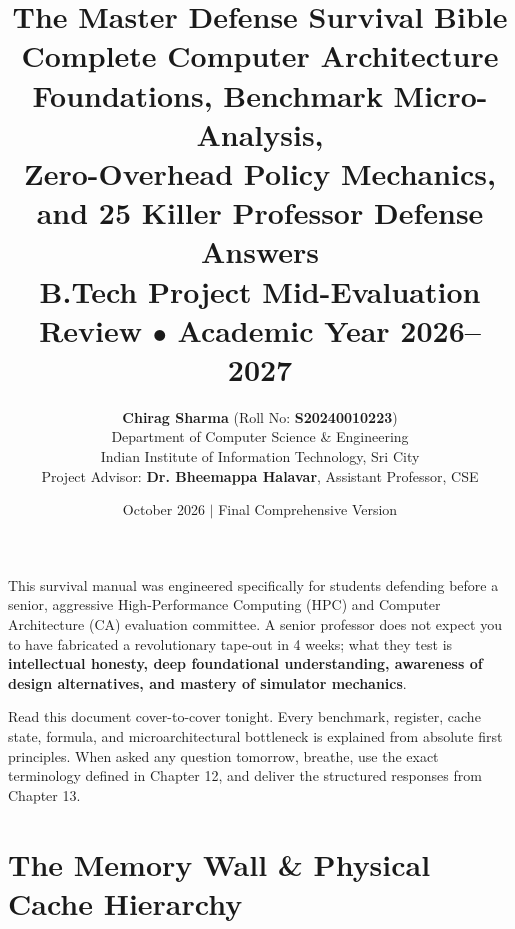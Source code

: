 \documentclass[11pt, a4paper]{article}
\title{\vspace{-1.0cm}\textbf{\huge The Master Defense Survival Bible}\\[0.3cm]
\Large Complete Computer Architecture Foundations, Benchmark Micro-Analysis,\\
Zero-Overhead Policy Mechanics, and 25 Killer Professor Defense Answers\\[0.2cm]
\large\color{NavyBlue}\textbf{B.Tech Project Mid-Evaluation Review \quad $\bullet$ \quad Academic Year 2026--2027}}
\author{\textbf{Chirag Sharma} (Roll No: \textbf{S20240010223})\\[0.08cm]
Department of Computer Science \& Engineering\\
Indian Institute of Information Technology, Sri City\\[0.08cm]
Project Advisor: \textbf{Dr. Bheemappa Halavar}, Assistant Professor, CSE}
\date{October 2026 \quad $\vert$ \quad Final Comprehensive Version}
\begin{document}
\maketitle

\begin{calloutbox}[title=\textbf{How to Use This Bible Tonight}]
This survival manual was engineered specifically for students defending before a senior, aggressive High-Performance Computing (HPC) and Computer Architecture (CA) evaluation committee. A senior professor does not expect you to have fabricated a revolutionary tape-out in 4 weeks; what they test is \textbf{intellectual honesty, deep foundational understanding, awareness of design alternatives, and mastery of simulator mechanics}. 

Read this document cover-to-cover tonight. Every benchmark, register, cache state, formula, and microarchitectural bottleneck is explained from absolute first principles. When asked any question tomorrow, breathe, use the exact terminology defined in Chapter 12, and deliver the structured responses from Chapter 13.
\end{calloutbox}

\vspace{0.2cm}
\tableofcontents
\vspace{0.4cm}
\newpage

\section{The Memory Wall \& Physical Cache Hierarchy}
\end{document}
